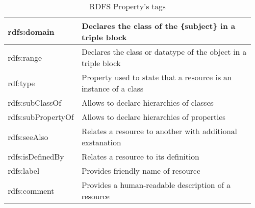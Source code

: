 \begin{itemize}
\begin{table}[H]
\centering
\caption{RDFS Property's tags}
\label{prop_tag}
\begin{tabular}{|l|l|}
\hline
rdfs:domain        & Declares the class of the \texttt\{subject\} in a triple block   \\ \hline
rdfs:range         & Declares the class or datatype of the object in a triple block   \\ \hline
rdf:type           & Property used to state that a resource is an instance of a class \\ \hline
rdfs:subClassOf    & Allows to declare hierarchies of classes                         \\ \hline
rdfs:subPropertyOf & Allows to declare hierarchies of properties                      \\ \hline
rdfs:seeAlso       & Relates a resource to another with additional exstanation        \\ \hline
rdfs:isDefinedBy   & Relates a resource to its definition                             \\ \hline
rdfs:label         & Provides friendly name of resource                               \\ \hline
rdfs:comment       & Provides a human-readable description of a resource              \\ \hline
\end{tabular}
\end{table}
    
     


      
\end{itemize}

